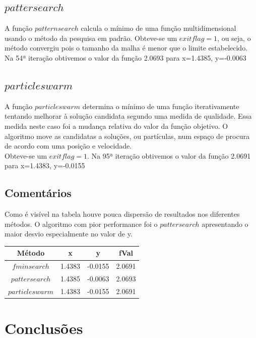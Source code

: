 \documentclass[a4paper,12pt]{article}
\begin{document}
\subsection{$pattersearch$}


A função $patternsearch$ calcula  o  mínimo  de  uma  função  multidimensional usando o método da pesquisa em padrão. Obteve-se um $exitflag=1$, ou seja, o método convergiu pois o tamanho da malha é menor que o limite estabelecido. Na 54ª iteração obtivemos o valor da função 2.0693 para x=1.4385, y=-0.0063

\subsection{$particleswarm$}

A função $particleswarm$ determina o mínimo de uma função iterativamente tentando melhorar à solução candidata segundo uma medida de qualidade. Essa medida neste caso foi a mudança relativa do valor da função objetivo. O algoritmo move as candidatas a soluções, ou partículas, num espaço de procura de acordo com uma posição e velocidade. \\
Obteve-se um $exitflag=1$. Na 95ª iteração obtivemos o valor da função 2.0691 para x=1.4383, y=-0.0155

\subsection{Comentários}

Como é visível na tabela houve pouca dispersão de resultados nos diferentes métodos. O algoritmo com pior performance foi o $pattersearch$ apresentando o maior desvio especialmente no valor de y.

\begin{center}
\begin{tabular}{ c |c |c |c }
 \textbf{Método} & \textbf{x} & \textbf{y} & \textbf{fVal} \\ 
 \hline
 $fminsearch$ & 1.4383 & -0.0155 & 2.0691 \\  
 $pattersearch$ & 1.4385 & -0.0063 & 2.0693 \\
 $particleswarm$ & 1.4383 & -0.0155 & 2.0691 
\end{tabular}
\end{center}

\section{Conclusões}
\end{document}
